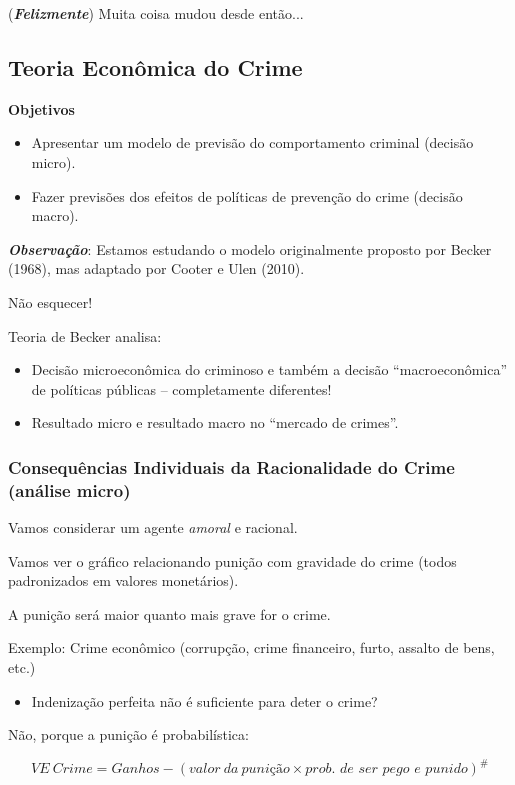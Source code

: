 \documentclass[a4paper,12pt]{article}[abntex2]
\begin{document}
(\textbf{\textit{Felizmente}}) Muita coisa mudou desde então...

\subsection{\textbf{Teoria Econômica do Crime}}
\textbf{Objetivos}\begin{itemize}
    \item Apresentar um modelo de previsão do comportamento criminal (decisão micro).
    \item Fazer previsões dos efeitos de políticas de prevenção do crime (decisão macro).
\end{itemize}

\textbf{\textit{Observação}}: Estamos estudando o modelo originalmente proposto por Becker (1968), mas adaptado por Cooter e Ulen (2010).

Não esquecer!

Teoria de Becker analisa:
\begin{itemize}
  \item Decisão microeconômica do criminoso e também a decisão ``macroeconômica'' de políticas públicas – completamente diferentes!
  \item Resultado micro e resultado macro no ``mercado de crimes''.
\end{itemize}

\subsubsection{\textbf{Consequências Individuais da Racionalidade do Crime (análise micro)}}
Vamos considerar um agente \textit{amoral} e racional.

Vamos ver o gráfico relacionando punição com gravidade do crime (todos padronizados em valores monetários).

A punição será maior quanto mais grave for o crime.

Exemplo: Crime econômico (corrupção, crime financeiro, furto, assalto de bens, etc.)

\begin{itemize}
  \item Indenização perfeita não é suficiente para deter o crime?
\end{itemize}

Não, porque a punição é probabilística:

\begin{equation*}
\mathit{VE\ Crime = Ganhos - (valor\ da\ punição \times \textit{prob. de ser pego e punido})^\#}
\end{equation*}
\end{document}

